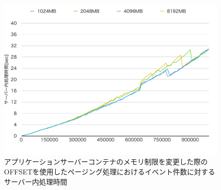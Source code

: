 \documentclass[../../../../../main]{subfiles}
\begin{document}
    \begin{figure}[H]
        \centering
        \includegraphics[width=12cm]{graph}
        \caption{アプリケーションサーバーコンテナのメモリ制限を変更した際のOFFSETを使用したページング処理におけるイベント件数に対するサーバー内処理時間}
        \label{fig:paging-offset-change-app-memory-limit-server-time-app_4_db_1_1024}
    \end{figure}
\end{document}
